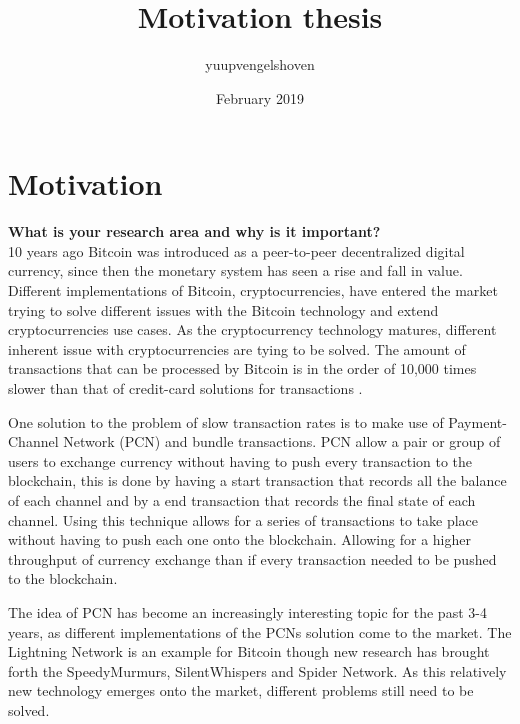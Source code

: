 \documentclass{article}
\title{Motivation thesis}
\author{yuupvengelshoven }
\date{February 2019}
\begin{document}
\maketitle 



\section{Motivation}


\textbf{What is your research area and why is it important?} \\


10 years ago Bitcoin was introduced as a peer-to-peer decentralized digital currency\cite{nakamoto2008bitcoin}, since then the monetary system has seen a rise and fall in value. Different implementations of Bitcoin, cryptocurrencies, have entered the market trying to solve different issues with the Bitcoin technology and extend cryptocurrencies use cases\cite{wood2014ethereum, buterin2014next}. As the cryptocurrency technology matures, different inherent issue with cryptocurrencies are tying to be solved. The amount of transactions that can be processed by Bitcoin is in the order of 10,000 times slower than that of credit-card solutions for transactions \cite{trillo2013stress}. 

One solution to the problem of slow transaction rates is to make use of Payment-Channel Network (PCN) and bundle transactions\cite{poon2016bitcoin}. PCN allow a pair or group of users to exchange currency without having to push every transaction to the blockchain, this is done by having a start transaction that records all the balance of each channel and by a end transaction that records the final state of each channel. Using this technique allows for a series of transactions to take place without having to push each one onto the blockchain. Allowing for a higher throughput of currency exchange than if every transaction needed to be pushed to the blockchain. 

The idea of PCN has become an increasingly interesting topic for the past 3-4 years, as different implementations of the PCNs solution come to the market. The Lightning Network is an example for Bitcoin\cite{poon2016bitcoin} though new research has brought forth the SpeedyMurmurs\cite{roos2017settling}, SilentWhispers\cite{malavolta2017silentwhispers} and Spider Network\cite{sivaraman2018routing}. As this relatively new technology emerges onto the market, different problems still need to be solved. 
\end{document}
